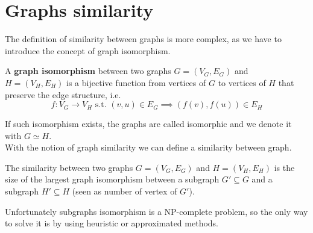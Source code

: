 \section{Graphs similarity}

The definition of similarity between graphs is more complex, as we have to introduce the concept of graph isomorphism.

\begin{definizione}
	A \textbf{graph isomorphism} between two graphs $G=(V_{G}, E_{G})$ and $H=(V_{H}, E_{H})$ is a bijective function from vertices of $G$ to vertices of $H$ that preserve the edge structure, i.e.  
	\begin{equation*}
		f : V_{G} \rightarrow V_{H} \text{ s.t. } (v, u) \in E_{G} \implies (f(v), f(u)) \in E_{H}
	\end{equation*}
\end{definizione}

If such isomorphism exists, the graphs are called isomorphic and we denote it with $G \simeq H$.\\ 

With the notion of graph similarity we can define a similarity between graph\cite{Bunke:1998:GDM:289720.289729}.

\begin{definizione}
	The similarity between two graphs $G=(V_{G}, E_{G})$ and $H=(V_{H}, E_{H})$ is the size of the largest graph isomorphism between a subgraph $G' \subseteq G$ and a subgraph $H' \subseteq H$ (seen as number of vertex of $G'$).
\end{definizione}

Unfortunately subgraphs isomorphism is a NP-complete problem\cite{GareyJohnson:1979}, so the only way to solve it is by using heuristic or approximated methods.

